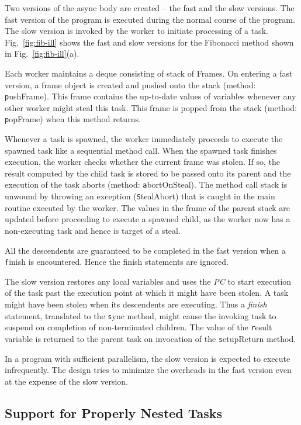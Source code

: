 Two versions of the async body are created -- the fast and the slow
versions. The fast version of the program is executed during the
normal course of the program. The slow version is invoked by the
worker to initiate processing of a task. Fig.~\ref{fig:fib-ill} shows
the fast and slow versions for the Fibonacci method shown in
Fig.~\ref{fig:fib-ill}(a).

Each worker maintains a deque consisting of stack of Frames. On
entering a fast version, a frame object is created and pushed onto the
stack (method: {\texttt pushFrame}). This frame contains the
up-to-date values of variables whenever any other worker might steal
this task. This frame is popped from the stack (method: {\texttt
popFrame}) when this method returns.

Whenever a task is spawned, the worker immediately proceeds to execute
the spawned task like a sequential method call. When the spawned task
finishes execution, the worker checks whether the current frame was
stolen. If so, the result computed by the child task is stored to be
passed onto its parent and the execution of the task aborts (method:
{\texttt abortOnSteal}). The method call stack is unwound by throwing
an exception ({\texttt StealAbort}) that is caught in the main
routine executed by the worker. The values in the frame of the parent
stack are updated before proceeding to execute a spawned child, as the
worker now has a non-executing task and hence is target of a steal. 

All the descendents are guaranteed to be completed in the fast version
when a {\texttt finish} is encountered. Hence the finish statements
are ignored.

The slow version restores any local variables and uses the {\em PC} to
start execution of the task past the execution point at which it might
have been stolen. A task might have been stolen when its descendents
are executing. Thus a {\em finish} statement, translated to the
{\texttt sync} method, might cause the invoking task to suspend on
completion of non-terminated children. The value of the {\texttt
  result} variable is returned to the parent task on invocation of the
{\texttt setupReturn} method. 

In a program with sufficient parallelism, the slow version is expected
to execute infrequently. The design tries to minimize the overheads in
the fast version even at the expense of the slow version. 

\subsection{Support for Properly Nested Tasks}

